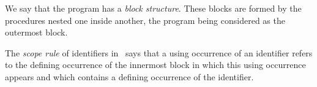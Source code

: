 {\begin{minipage}{\myparboxwidth}
{\vspace{\neglskip}\mbox{}\par
\vspace{0.3\baselineskip}
\vspace{\neglskip}\mbox{}\par
\vspace{0.3\baselineskip}
\vspace{\neglskip}\mbox{}\par
\vspace{\neglskip}\mbox{\blc \blk{}}\par
\vspace{\neglskip}\mbox{\blc \blk\blk\blk{}}\par
\vspace{\neglskip}\mbox{\blc \blk\blk\blk{}}\par
\vspace{\neglskip}\mbox{\blc \blk\blk\blk{}}\par
\vspace{\neglskip}\mbox{\blc \blk{}}\par
\vspace{\neglskip}\mbox{\blc \blk{}}\par
\vspace{\neglskip}\mbox{\blc \blk{}}\par
\vspace{0.3\baselineskip}
\vspace{\neglskip}\mbox{}\par
\vspace{\neglskip}\mbox{}\par
\vspace{\neglskip}\mbox{}\par

\medskip }

We say that the program has a {\em block structure}. These blocks are formed by the procedures nested 
 one inside another, the program being considered as the outermost block. 
 
 The {\em scope 
 rule} of identifiers in \python\ says that a using occurrence of an identifier
 refers to the defining occurrence of the innermost block in which this using occurrence appears and
 which contains a defining occurrence of the identifier. 

\vspace{\abovedisplayskip}
\end{minipage}
}

